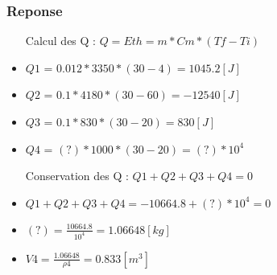 \subsubsection{Reponse}
\begin{itemize}
    \item[Calcul des Q] : $Q = Eth = m * Cm * (Tf-Ti)$
    \item $Q1$ = $0.012 * 3350 * (30 - 4) = 1045.2[J] $
    \item $Q2$ = $0.1 * 4180 * (30 - 60) = -12540[J]$
    \item $Q3$ = $0.1 * 830 * (30 - 20) = 830[J]$
    \item $Q4$ = $(?) * 1000 * (30 - 20) = (?) * 10^{4}$
    \item[Conservation des Q] : $Q1 + Q2 +Q3 + Q4 = 0$
    \item $Q1 + Q2 + Q3 + Q4 = -10664.8 + (?) * 10^4 = 0$
    \item $(?) = \frac{10664.8}{10^4} = 1.06648[kg]$ 
    \item $V4 = \frac{1.06648}{{\rho}4} = 0.833[m^3]$
\end{itemize}

